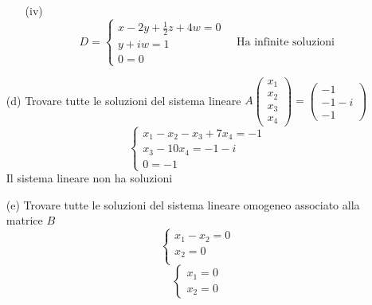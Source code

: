 \documentclass[a4paper]{article}
\theoremstyle{break}
\theoremstyle{break}
\theoremstyle{break}
\theoremstyle{break}
\begin{document}
\begin{enumerate}
\begin{enumerate}
		      \item[(iv)]
		            \[
			            D = \begin{cases}
				            x -2y + \frac{1}{2}z + 4w = 0 \\
				            y + iw = 1                    \\
				            0 = 0
			            \end{cases}
			            \quad
			            \text{Ha infinite soluzioni}
		            \]
	      \end{enumerate}
	\item[(d)] Trovare tutte le soluzioni del sistema lineare \( A \begin{pmatrix}
		      x_1 \\
		      x_2 \\
		      x_3 \\
		      x_4
	      \end{pmatrix} = \begin{pmatrix}
		      -1    \\
		      -1 -i \\
		      -1
	      \end{pmatrix}   \)
	      \[
		      \begin{cases}
			      x_1 - x_2 - x_3 + 7x_4 = -1 \\
			      x_3 -10x_4 = -1 -i          \\
			      0 = -1
		      \end{cases}
	      \]
	      Il sistema lineare non ha soluzioni
	\item[(e)] Trovare tutte le soluzioni del sistema lineare omogeneo associato alla
	      matrice \( B \)
	      \[
		      \begin{cases}
			      x_1 - x_2 = 0 \\
			      x_2 = 0       \\
		      \end{cases}
	      \]
	      \[
		      \begin{cases}
			      x_1 = 0 \\
			      x_2 = 0
		      \end{cases}
	      \]
\end{enumerate}
\end{document}
